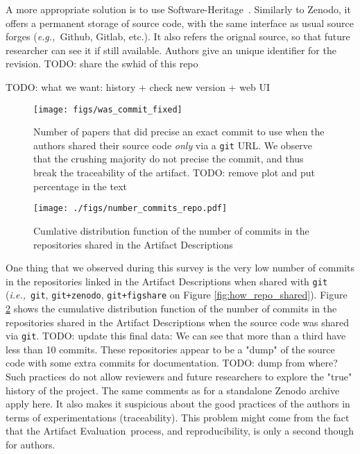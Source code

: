 \documentclass[sigconf,natbib=false]{acmart}
\newcommand{\ie}{\emph{i.e.,}}
\newcommand{\eg}{\emph{e.g.,}}
\newcommand{\ad}{Artifact Description}
\newcommand{\aeval}{Artifact Evaluation}
\newcommand{\todo}[1]{{\color{red}TODO: #1}}
\begin{document}
A more appropriate solution is to use Software-Heritage\ \cite{swheritage, di2017software}.
Similarly to Zenodo, it offers a permanent storage of source code, with the same interface as usual source forges (\eg\ Github, Gitlab, etc.).
It also refers the orignal source, so that future researcher can see it if still available.
Authors give an unique identifier for the revision. 
\todo{share the swhid of this repo}

\todo{what we want: history + check new version + web UI}

\begin{figure}
  \centering
  \texttt{[image: figs/was\_commit\_fixed]}
  \caption{Number of papers that did precise an exact commit to use when the authors shared their source code \emph{only} via a \texttt{git} URL. We observe that the crushing majority do not precise the commit, and thus break the traceability of the artifact. \todo{remove plot and put percentage in the text}}\label{fig:was_commit_fixed}
\end{figure}

\begin{figure}
  \centering
  \texttt{[image: ./figs/number\_commits\_repo.pdf]}
  \caption{Cumlative distribution function of the number of commits in the repositories shared in the \ad s}\label{fig:number_commits_repo}
\end{figure}

One thing that we observed during this survey is the very low number of commits in the repositories linked in the \ad s when shared with \texttt{git} (\ie\ \texttt{git}, \texttt{git+zenodo}, \texttt{git+figshare} on Figure \ref{fig:how_repo_shared}).
Figure \ref{fig:number_commits_repo} shows the cumulative distribution function of the number of commits in the repositories shared in the \ad s when the source code was shared via \texttt{git}.
\todo{update this final data: We can see that more than a third have less than 10 commits.}
These repositories appear to be a "dump" of the source code with some extra commits for documentation.
\todo{dump from where?}
Such practices do not allow reviewers and future researchers to explore the "true" history of the project.
The same comments as for a standalone Zenodo archive apply here.
It also makes it suspicious about the good practices of the authors in terms of experimentations (traceability).
This problem might come from the fact that the \aeval\ process, and reproducibility, is only a second though for authors.
\end{document}
